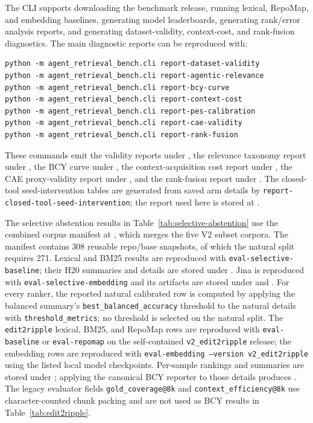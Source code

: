 \documentclass[11pt]{article}
\newcommand{\code}[1]{\texttt{#1}}
\begin{document}
The CLI supports downloading the benchmark release, running lexical, RepoMap, and embedding baselines, generating model leaderboards, generating rank/error analysis reports, and generating dataset-validity, context-cost, and rank-fusion diagnostics. The main diagnostic reports can be reproduced with:
\begin{verbatim}
python -m agent_retrieval_bench.cli report-dataset-validity
python -m agent_retrieval_bench.cli report-agentic-relevance
python -m agent_retrieval_bench.cli report-bcy-curve
python -m agent_retrieval_bench.cli report-context-cost
python -m agent_retrieval_bench.cli report-pes-calibration
python -m agent_retrieval_bench.cli report-cae-validity
python -m agent_retrieval_bench.cli report-rank-fusion
\end{verbatim}
These commands emit the validity reports under , the relevance taxonomy report under , the BCY curve under , the context-acquisition cost report under , the CAE proxy-validity report under , and the rank-fusion report under . The closed-tool seed-intervention tables are generated from saved arm details by \code{report-closed-tool-seed-intervention}; the report used here is stored at .

The selective abstention results in Table~\ref{tab:selective-abstention} use the combined corpus manifest at , which merges the five V2 subset corpora. The manifest contains 308 reusable repo/base snapshots, of which the natural split requires 271. Lexical and BM25 results are reproduced with \code{eval-selective-baseline}; their H20 summaries and details are stored under . Jina is reproduced with \code{eval-selective-embedding} and its artifacts are stored under  and . For every ranker, the reported natural calibrated row is computed by applying the balanced summary's \code{best\_balanced\_accuracy} threshold to the natural details with \code{threshold\_metrics}; no threshold is selected on the natural split. The \code{edit2ripple} lexical, BM25, and RepoMap rows are reproduced with \code{eval-baseline} or \code{eval-repomap} on the self-contained \code{v2\_edit2ripple} release; the embedding rows are reproduced with \code{eval-embedding --version v2\_edit2ripple} using the listed local model checkpoints. Per-sample rankings and summaries are stored under ; applying the canonical BCY reporter to those details produces . The legacy evaluator fields \code{gold\_coverage@8k} and \code{context\_efficiency@8k} use character-counted chunk packing and are not used as BCY results in Table~\ref{tab:edit2ripple}.
\end{document}
